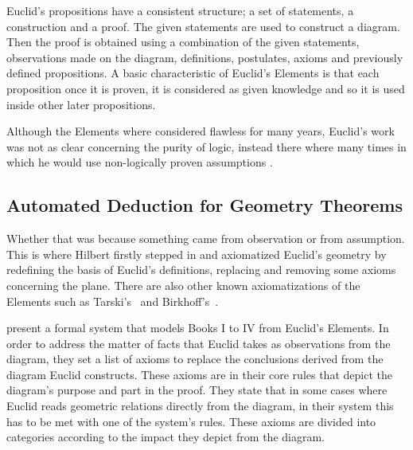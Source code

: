 \documentclass[]{interact}
\theoremstyle{plain}
\theoremstyle{definition}
\theoremstyle{remark}
\begin{document}
Euclid’s propositions have a consistent structure; a set of statements, a 
construction and a proof. The given statements are used to construct a diagram.
Then the proof is obtained using a combination of the given statements, 
observations made on the diagram, definitions, postulates, axioms and 
previously defined propositions. 
A basic characteristic of Euclid's
Elements is that each proposition once it is proven, it is considered
as given knowledge and so it is used inside other later propositions.

Although the Elements where considered flawless for many years,
Euclid's work was not as clear concerning the purity of logic, instead
there where many times in which he would use non-logically proven
assumptions \citep[Sections~1.1 and~2]{harrison:2009}.


\subsection{Automated Deduction for Geometry Theorems}
\label{sec:atp-geometry}

Whether that was because
something came from observation or from assumption. This is where
Hilbert\cite{hilbert1899geometrie} firstly stepped in and axiomatized
Euclid's geometry by redefining the basis of Euclid's definitions,
replacing and removing some axioms concerning the plane. There are
also other known axiomatizations of the Elements such as
Tarski's~\cite{tarski1959elementary} and
Birkhoff's~\cite{birkhoff1932set}.

\citet{avigad-etal:2009} present a formal system that models
Books I to IV from Euclid's Elements. In order to address the matter
of facts that Euclid takes as observations from the diagram, they set
a list of axioms to replace the conclusions derived from the diagram
Euclid constructs. These axioms are in their core rules that depict
the diagram's purpose and part in the proof. They state that in some
cases where Euclid reads geometric relations directly from the
diagram, in their system this has to be met with one of the system's
rules. These axioms are divided into categories according to the
impact they depict from the diagram.
\end{document}
